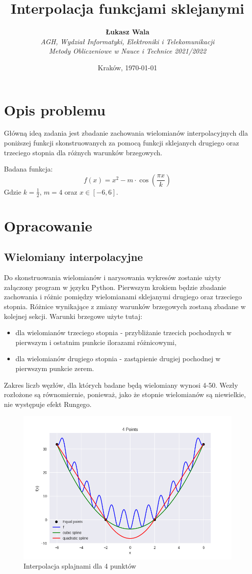 \documentclass{article}
\title{Interpolacja funkcjami sklejanymi}
\author{\textbf{Łukasz Wala}\\
    \textit{AGH, Wydział Informatyki, Elektroniki i Telekomunikacji} \\
    \textit{Metody Obliczeniowe w Nauce i Technice 2021/2022}}
\date{Kraków, \today}
\begin{document}
\maketitle

\section{Opis problemu}
Główną ideą zadania jest zbadanie zachowania wielomianów interpolacyjnych
dla poniższej funkcji skonstruowanych za pomocą funkcji sklejanych drugiego oraz
trzeciego stopnia dla różnych warunków brzegowych.

Badana funkcja:
\[f(x)=x^2-m\cdot\cos\left(\frac{\pi x}{k}\right)\]
Gdzie $k=\frac{1}{2}$, $m=4$ oraz $x\in [-6,6]$.

\section{Opracowanie}
\subsection{Wielomiany interpolacyjne}
Do skonstruowania wielomianów i narysowania wykresów zostanie użyty załączony program w języku Python.
Pierwszym krokiem będzie zbadanie zachowania i różnic pomiędzy wielomianami sklejanymi drugiego oraz trzeciego 
stopnia. Różnice wynikające z zmiany warunków brzegowych zostaną zbadane w kolejnej sekcji. Warunki brzegowe użyte tutaj:
\begin{itemize}
    \item
    dla wielomianów trzeciego stopnia - przybliżanie trzecich pochodnych w pierwszym i ostatnim punkcie ilorazami różnicowymi,
    \item
    dla wielomianów drugiego stopnia - zastąpienie drugiej pochodnej w pierwszym punkcie zerem.
\end{itemize}

Zakres liczb węzłów, dla których badane będą wielomiany wynosi 4-50. Wezły rozłożone są równomiernie, ponieważ, 
jako że stopnie wielomianów są niewielkie, nie występuje efekt Rungego.

\begin{figure}[H]
    \centering
    \includegraphics[width=\textwidth]{img/spline_4.png}
    \caption{Interpolacja splajnami dla 4 punktów}
\end{figure}
\end{document}
